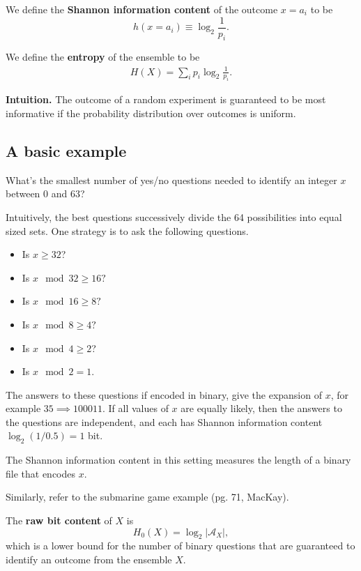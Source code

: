 \medskip

\begin{definition}
  We define the {\bf Shannon information content} of the outcome $x = a_i$ to be
  \[
    h(x = a_i) \equiv \log_2 \frac{1}{p_i}.
  \]
\end{definition}

\begin{definition}
  We define the {\bf entropy} of the ensemble to be
  \begin{align*}
    H(X) = \sum_{i} p_i \log_2 \frac{1}{p_i}.
  \end{align*}
\end{definition}

{\bf Intuition.} The outcome of a random experiment is guaranteed to be most informative if the probability distribution over outcomes is uniform.

\subsection{A basic example}

What's the smallest number of yes/no questions needed to identify an integer $x$ between 0 and 63?

Intuitively, the best questions successively divide the 64 possibilities into equal sized sets.  One strategy is to ask the following questions.

\begin{itemize}
  \item Is $x \geq 32$?
  \item Is $x \mod{32} \geq 16?$
  \item Is $x \mod{16} \geq 8?$
  \item Is $x \mod{8} \geq 4?$
  \item Is $x \mod{4} \geq 2$?
  \item Is $x \mod{2} = 1$.
\end{itemize}

The answers to these questions if encoded in binary, give the expansion of $x$, for example $35 \implies 100011$.  If all values of $x$ are equally likely, then the answers to the questions are independent, and each has Shannon information content $\log_2 (1 / 0.5) = 1$ bit.

The Shannon information content in this setting measures the length of a binary file that encodes $x$.

Similarly, refer to the submarine game example (pg. 71, MacKay).

\begin{definition}
  The {\bf raw bit content} of $X$ is 
  \[
    H_0(X) = \log_2 | \mathcal{A}_X |,
  \]
which is a lower bound for the number of binary questions that are guaranteed to identify an outcome from the ensemble $X$.
\end{definition}

